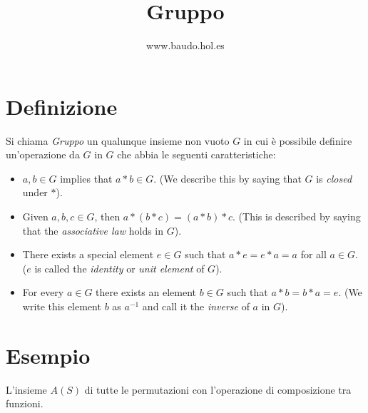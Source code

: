 \documentclass[a4paper,10pt]{article}
\title{Gruppo}
\author{www.baudo.hol.es}
\begin{document}
\maketitle

\section{Definizione}
Si chiama \textit{Gruppo} un qualunque insieme non vuoto $G$ in cui è possibile definire un'operazione da $G$ in $G$ che abbia le seguenti caratteristiche:
\begin{itemize}
 \item $a, b \in G$ implies that $a*b \in G$. (We describe this by saying that $G$ is \textit{closed} under $*$).
 \item Given $a, b, c \in G$, then $a * (b*c) = (a*b)*c$. (This is described by saying that the \textit{associative law} holds in $G$).
 \item There exists a special element $e \in G$ such that $a*e=e*a=a$ for all $a \in G$. ($e$ is called the \textit{identity} or \textit{unit element} of $G$).
 \item For every $a \in G$ there exists an element $b \in G$ such that $a*b=b*a=e$. (We write this element $b$ as $a^{-1}$ and call it the \textit{inverse} of $a$ in $G$).
\end{itemize}

\section{Esempio}
L'insieme $A(S)$ di tutte le permutazioni con l'operazione di composizione tra funzioni.
\end{document}
